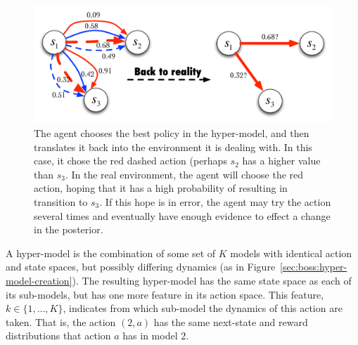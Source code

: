 \begin{figure}[t]
\begin{center}
\includegraphics[width=0.75\linewidth]{hyper-to-real}
\caption{The agent chooses the best policy in the hyper-model, and then translates it back into the environment it is dealing with. In this case, it chose the red dashed action (perhaps $s_2$ has a higher value than $s_3$. In the real environment, the agent will choose the red action, hoping that it has a high probability of resulting in transition to $s_3$. If this hope is in error, the agent may try the action several times and eventually have enough evidence to effect a change in the posterior.}
\label{sec:boss:hyper-to-real}
\end{center}
\end{figure}

A hyper-model is the combination of some set of $K$ models with identical action and state spaces, but possibly differing dynamics (as in Figure~\ref{sec:boss:hyper-model-creation}). The resulting hyper-model  has the same state space as each of its sub-models, but has one more feature in its action space. This feature, $k\in\{1,...,K\}$, indicates from which sub-model the dynamics of this action are taken. That is, the action $(2, a)$ has the same next-state and reward distributions that action $a$ has in model $2$.


